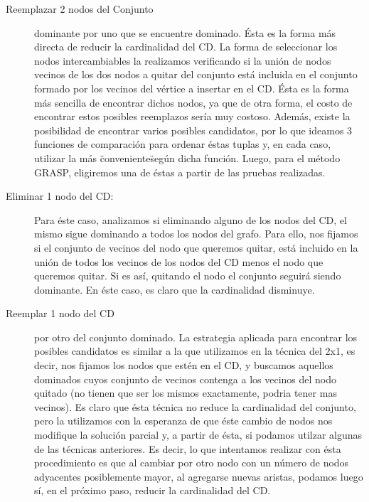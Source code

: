\begin{description}
\item[Reemplazar 2 nodos del Conjunto] dominante por uno que se encuentre dominado. Ésta es la forma más directa de reducir la cardinalidad del CD. La forma de seleccionar los nodos intercambiables la realizamos verificando si la unión de nodos vecinos de los dos nodos a quitar del conjunto está incluida en el conjunto formado por los vecinos del vértice a insertar en el CD. Ésta es la forma más sencilla de encontrar dichos nodos, ya que de otra forma, el costo de encontrar estos posibles reemplazos sería muy costoso. Además, existe la posibilidad de encontrar varios posibles candidatos, por lo que ideamos 3 funciones de comparación para ordenar éstas tuplas y, en cada caso, utilizar la más \"conveniente\" según dicha función. Luego, para el método GRASP, eligiremos una de éstas a partir de las pruebas realizadas.
\item[Eliminar 1 nodo del CD:] Para éste caso, analizamos si eliminando alguno de los nodos del CD, el mismo sigue dominando a todos los nodos del grafo. Para ello, nos fijamos si el conjunto de vecinos del nodo que queremos quitar, está incluido en la unión de todos los vecinos de los nodos del CD menos el nodo que queremos quitar. Si es así, quitando el nodo el conjunto seguirá siendo dominante. En éste caso, es claro que la cardinalidad disminuye.
\item[Reemplar 1 nodo del CD] por otro del conjunto dominado. La estrategia aplicada para encontrar los posibles candidatos es similar a la que utilizamos en la técnica del 2x1, es decir, nos fijamos los nodos que estén en el CD, y buscamos aquellos dominados cuyos conjunto de vecinos contenga a los vecinos del nodo quitado (no tienen que ser los mismos exactamente, podria tener mas vecinos). Es claro que ésta técnica no reduce la cardinalidad del conjunto, pero la utilizamos con la esperanza de que éste cambio de nodos nos modifique la solución parcial y, a partir de ésta, si podamos utilzar algunas de las técnicas anteriores. Es decir, lo que intentamos realizar con ésta procedimiento es que al cambiar por otro nodo con un número de nodos adyacentes posiblemente mayor, al agregarse nuevas aristas, podamos luego sí, en el próximo paso, reducir la cardinalidad del CD.
\end{description}

